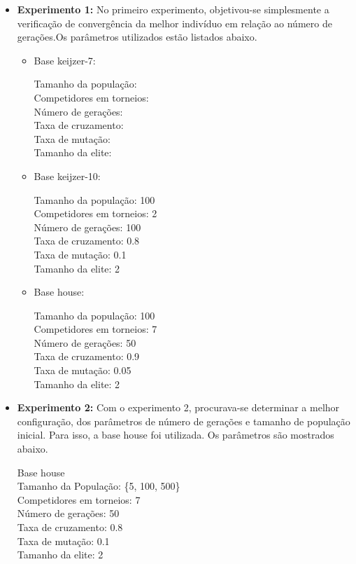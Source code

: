\documentclass[12pt]{article}
\begin{document}
\begin{itemize}
 \item \textbf{Experimento 1:} No primeiro experimento, objetivou-se simplesmente a verificação
 de convergência da melhor indivíduo em relação ao número de gerações.Os parâmetros utilizados
 estão listados abaixo. \\
 
 \begin{itemize}
  \item Base keijzer-7:
  
  Tamanho da população: \\
  Competidores em torneios: \\
  Número de gerações: \\
  Taxa de cruzamento: \\
  Taxa de mutação: \\
  Tamanho da elite: \\
 
  \item Base keijzer-10:
  
  Tamanho da população: 100\\
  Competidores em torneios: 2\\
  Número de gerações: 100\\
  Taxa de cruzamento: 0.8\\
  Taxa de mutação: 0.1\\
  Tamanho da elite: 2\\
  
  \item Base house:
  
  Tamanho da população: 100\\
  Competidores em torneios: 7\\
  Número de gerações: 50\\
  Taxa de cruzamento: 0.9\\
  Taxa de mutação: 0.05\\
  Tamanho da elite: 2\\
  
 \end{itemize}
 
 \item \textbf{Experimento 2:} Com o experimento 2, procurava-se determinar a melhor configuração,
 dos parâmetros de número de gerações e tamanho de população inicial. Para isso, a base house foi
 utilizada. Os parâmetros são mostrados abaixo.
 
 Base house \\
 Tamanho da População: \{5, 100, 500\} \\
 Competidores em torneios: 7 \\
 Número de gerações: 50 \\
 Taxa de cruzamento: 0.8 \\
 Taxa de mutação: 0.1 \\
 Tamanho da elite: 2 \\
 

\end{itemize}
\end{document}
